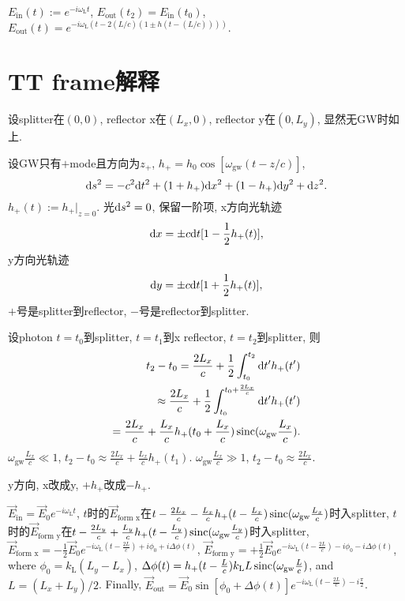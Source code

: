 $E_\text{in}(t):=e^{-i\omega_\text{L} t}$, $E_\text{out}(t_2)=E_\text{in}(t_0)$, $E_\text{out}(t)=e^{-i\omega_\text{L} (t-2(L/c)(1 \pm h(t-(L/c))))}$.

\section{TT frame解释}

设splitter在$(0,0)$, reflector x在$(L_x,0)$, reflector y在$(0,L_y)$, 显然无GW时如上.

设GW只有$+$mode且方向为$z_+$, $h_+=h_0\cos[\omega_\text{gw}(t-z/c)]$, 
\begin{equation}
    \mathrm{d} s^2=-c^2\mathrm{d} t^2+(1 +h_+)\mathrm{d} x^2+ (1-h_+)\mathrm{d} y^2+\mathrm{d} z^2.
\end{equation}
$h_+(t):=h_+|_{z=0}$. 光$\mathrm{d} s^2=0$, 保留一阶项, x方向光轨迹
\begin{equation}
    \mathrm{d} x=\pm c\mathrm{d} t[1-\frac{1}{2}h_+(t)],
\end{equation}
y方向光轨迹
\begin{equation}
    \mathrm{d} y=\pm c\mathrm{d} t[1+\frac{1}{2}h_+(t)],
\end{equation}
$+$号是splitter到reflector, $-$号是reflector到splitter.

设photon $t=t_0$到splitter, $t=t_1$到x reflector, $t=t_2$到splitter, 则
\begin{eqnarray}
    t_2-t_0=\frac{2L_x}{c}+\frac{1}{2}\int^{t_2}_{t_0}\mathrm{d} t'h_+(t')\\
    \approx\frac{2L_x}{c}+\frac{1}{2}\int^{t_0+\frac{2L_x}{c}}_{t_0}\mathrm{d} t'h_+(t')\\
    =\frac{2L_x}{c}+\frac{L_x}{c}h_+(t_0+\frac{L_x}{c})\operatorname{sinc}(\omega_\text{gw}\frac{L_x}{c}).
\end{eqnarray}
$\omega_\text{gw}\frac{L_x}{c}\ll1$, $t_2-t_0\approx\frac{2L_x}{c}+\frac{L_x}{c}h_+(t_1)$. $\omega_\text{gw}\frac{L_x}{c}\gg1$, $t_2-t_0\approx\frac{2L_x}{c}$.

y方向, x改成y, $+h_+$改成$-h_+$.

$\vec{E}_\text{in}=\vec{E}_0e^{-i\omega_\text{L}t}$, $t$时的$\vec{E}_\text{form x}$在$t-\frac{2L_x}{c}-\frac{L_x}{c}h_+(t-\frac{L_x}{c})\operatorname{sinc}(\omega_\text{gw}\frac{L_x}{c})$时入splitter, $t$时的$\vec{E}_\text{form y}$在$t-\frac{2L_y}{c}+\frac{L_y}{c}h_+(t-\frac{L_y}{c})\operatorname{sinc}(\omega_\text{gw}\frac{L_y}{c})$时入splitter, $\vec{E}_\text{form x}=-\frac{1}{2}\vec{E}_0e^{-i\omega_\text{L}(t-\frac{2L}{c})+i\phi_0+i\Delta\phi(t)}$, $\vec{E}_\text{form y}=+\frac{1}{2}\vec{E}_0e^{-i\omega_\text{L}(t-\frac{2L}{c})-i\phi_0-i\Delta\phi(t)}$, where $\phi_0=k_\text{L}(L_y-L_x)$, $\Delta\phi(t)=h_+(t-\frac{L}{c})k_\text{L}L\operatorname{sinc}(\omega_\text{gw}\frac{L}{c})$, and $L=(L_x+L_y)/2$. Finally, $\vec{E}_\text{out}=\vec{E}_0\sin[\phi_0+\Delta\phi(t)]e^{-i\omega_\text{L}(t-\frac{2L}{c})-i\frac{\pi}{2}}$.
